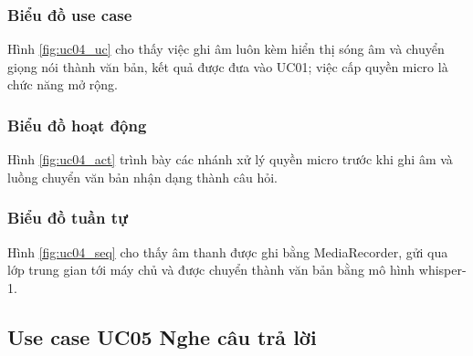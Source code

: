 \documentclass[../DoAn.tex]{subfiles}
\begin{document}
\subsubsection{Biểu đồ use case}
Hình \ref{fig:uc04_uc} cho thấy việc ghi âm luôn kèm hiển thị sóng âm và chuyển giọng nói thành văn bản, kết quả được đưa vào UC01; việc cấp quyền micro là chức năng mở rộng.


\subsubsection{Biểu đồ hoạt động}
Hình \ref{fig:uc04_act} trình bày các nhánh xử lý quyền micro trước khi ghi âm và luồng chuyển văn bản nhận dạng thành câu hỏi.


\subsubsection{Biểu đồ tuần tự}
Hình \ref{fig:uc04_seq} cho thấy âm thanh được ghi bằng MediaRecorder, gửi qua lớp trung gian tới máy chủ và được chuyển thành văn bản bằng mô hình whisper-1.



\subsection{Use case UC05 Nghe câu trả lời}
\label{subsection:uc05}
\end{document}
